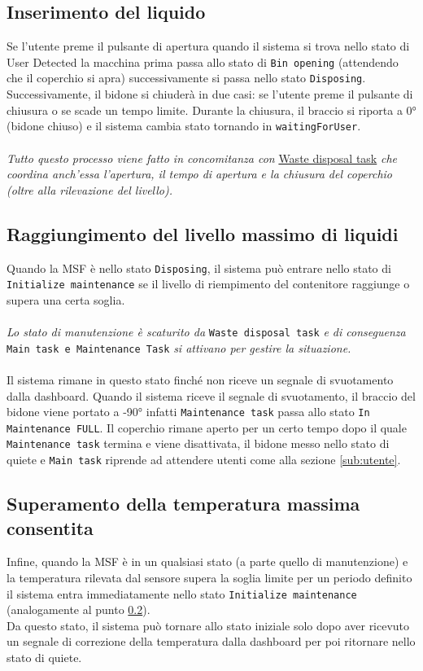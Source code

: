 \documentclass{report}
\begin{document}
\subsection{Inserimento del liquido}
\par {
Se l'utente preme il pulsante di apertura quando il sistema si trova nello stato di User Detected la macchina prima passa allo stato di \texttt{Bin opening} (attendendo che il coperchio si apra) successivamente si passa nello stato \texttt{Disposing}. Successivamente, il bidone si chiuderà in due casi: se l'utente preme il pulsante di chiusura o se scade un tempo limite. Durante la chiusura, il braccio si riporta a 0° (bidone chiuso) e il sistema cambia stato tornando in \texttt{waitingForUser}.\\ \\
\textit{
Tutto questo processo viene fatto in concomitanza con} \hyperref[fig:waste-task]{Waste disposal task} \textit{che coordina anch'essa l'apertura, il tempo di apertura e la chiusura del coperchio (oltre alla rilevazione del livello).
}
}
\subsection{Raggiungimento del livello massimo di liquidi}
\label{sub:liquids}
\par {
Quando la MSF è nello stato \texttt{Disposing}, il sistema può entrare nello stato di \texttt{Initialize maintenance} se il livello di riempimento del contenitore raggiunge o supera una certa soglia. 
\\
\\
\textit{Lo stato di manutenzione è scaturito da } \texttt{Waste disposal task} \textit{ e di conseguenza }\texttt{ Main task e Maintenance Task} \textit{ si attivano per gestire la situazione.}
\\
\\
Il sistema rimane in questo stato finché non riceve un segnale di svuotamento dalla dashboard. Quando il sistema riceve il segnale di svuotamento, il braccio del bidone viene portato a -90° infatti \texttt{Maintenance task} passa allo stato \texttt{In Maintenance FULL}. Il coperchio rimane aperto per un certo tempo dopo il quale \texttt{Maintenance task} termina e viene disattivata, il bidone messo nello stato di quiete e \texttt{Main task} riprende ad attendere utenti come alla sezione \ref{sub:utente}. 
}
\subsection{Superamento della temperatura massima consentita}
\par {
Infine, quando la MSF è in un qualsiasi stato (a parte quello di manutenzione) e la temperatura rilevata dal sensore supera la soglia limite per un periodo definito il sistema entra immediatamente nello stato \texttt{Initialize maintenance} (analogamente al punto \ref{sub:liquids}).\\
Da questo stato, il sistema può tornare allo stato iniziale solo dopo aver ricevuto un segnale di correzione della temperatura dalla dashboard per poi ritornare nello stato di quiete.
}
\end{document}
